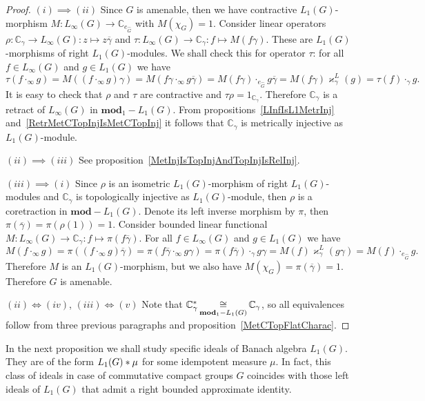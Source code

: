 \begin{proof} $(i)\implies (ii)$ Since $G$ is amenable, then we have
contractive $L_1(G)$-morphism $M:L_\infty(G)\to\mathbb{C}_{e_{\widehat{G}}}$
with $M(\chi_G)=1$. Consider linear 
operators $\rho:\mathbb{C}_\gamma\to L_\infty(G):z\mapsto z\overline{\gamma}$ 
and $\tau:L_\infty(G)\to\mathbb{C}_\gamma:f\mapsto M(f\gamma)$. These are
$L_1(G)$-morphisms of right $L_1(G)$-modules. We shall check this for operator
$\tau$: for all $f\in L_\infty(G)$ and $g\in L_1(G)$ we have
$$
\tau(f\cdot_\infty g)
=M((f\cdot_\infty g)\gamma)
=M(f\gamma\cdot_\infty g\overline{\gamma})
=M(f\gamma)\cdot_{e_{\widehat{G}}} g\overline{\gamma}
=M(f\gamma)\varkappa_\gamma^L(g)
=\tau(f)\cdot_{\gamma} g.
$$  
It is easy to check that $\rho$ and $\tau$ are contractive and
$\tau\rho=1_{\mathbb{C}_\gamma}$. Therefore $\mathbb{C}_\gamma$ is a retract of
$L_\infty(G)$ in $\mathbf{mod}_1-L_1(G)$. From
propositions~\ref{LInfIsL1MetrInj} and~\ref{RetrMetCTopInjIsMetCTopInj} it 
follows that $\mathbb{C}_\gamma$ is metrically injective as $L_1(G)$-module.

$(ii)\implies (iii)$ See proposition~\ref{MetInjIsTopInjAndTopInjIsRelInj}.

$(iii) \implies (i)$ Since $\rho$ is an isometric $L_1(G)$-morphism of right
$L_1(G)$-modules and $\mathbb{C}_\gamma$ is topologically injective as
$L_1(G)$-module, then $\rho$ is a coretraction in $\mathbf{mod}-L_1(G)$. Denote
its left inverse morphism by $\pi$, then
$\pi(\overline{\gamma})=\pi(\rho(1))=1$. Consider bounded linear functional
$M:L_\infty(G)\to\mathbb{C}_\gamma:f\mapsto \pi(f\overline{\gamma})$. For all
$f\in L_\infty(G)$ and $g\in L_1(G)$ we have
$$
M(f\cdot_\infty g)
=\pi((f\cdot_\infty g)\overline{\gamma})
=\pi(f\overline{\gamma}\cdot_\infty g\gamma)
=\pi(f\overline{\gamma})\cdot_{\gamma} g\gamma
=M(f)\varkappa_\gamma^L(g\gamma)
=M(f)\cdot_{e_{\widehat{G}}}g.
$$
Therefore $M$ is an $L_1(G)$-morphism, but we also have
$M(\chi_G)=\pi(\overline{\gamma})=1$. Therefore $G$ is amenable.

$(ii) \Longleftrightarrow (iv)$, $(iii) \Longleftrightarrow (v)$ Note that
$\mathbb{C}_\gamma^*\mathop{\mathbin{\cong}}\limits_{\mathbf{mod}_1-L_1(G)}\mathbb{C}_\gamma$, so all
equivalences  follow from three previous paragraphs and
proposition~\ref{MetCTopFlatCharac}.
\end{proof}

In the next proposition we shall study specific ideals of Banach algebra
$L_1(G)$. They are of the form $L_1(G)\ast\mu$ for some idempotent measure
$\mu$. In fact, this class of ideals in case of commutative compact groups $G$
coincides with those left ideals of $L_1(G)$ that admit a right bounded
approximate identity.

